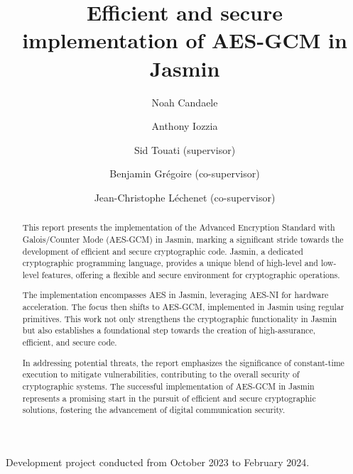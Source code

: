 \documentclass[runningheads]{llncs}
\begin{document}
%
\title{Efficient and secure implementation of AES-GCM in Jasmin}


%
%
\author{Noah Candaele \and Anthony Iozzia \and Sid Touati (supervisor) \and Benjamin Grégoire (co-supervisor) \and Jean-Christophe Léchenet (co-supervisor)}


%
%



%
\maketitle              %
%

\begin{center}
    Development project conducted from October 2023 to February 2024.
\end{center}

\thispagestyle{plain} %


\begin{abstract}
This report presents the implementation of the Advanced Encryption Standard with Galois/Counter Mode (AES-GCM) in Jasmin, marking a significant stride towards the development of efficient and secure cryptographic code. Jasmin, a dedicated cryptographic programming language, provides a unique blend of high-level and low-level features, offering a flexible and secure environment for cryptographic operations.

The implementation encompasses AES in Jasmin, leveraging AES-NI for hardware acceleration. The focus then shifts to AES-GCM, implemented in Jasmin using regular primitives. This work not only strengthens the cryptographic functionality in Jasmin but also establishes a foundational step towards the creation of high-assurance, efficient, and secure code.

 In addressing potential threats, the report emphasizes the significance of constant-time execution to mitigate vulnerabilities, contributing to the overall security of cryptographic systems. The successful implementation of AES-GCM in Jasmin represents a promising start in the pursuit of efficient and secure cryptographic solutions, fostering the advancement of digital communication security.

\end{abstract}
\end{document}
